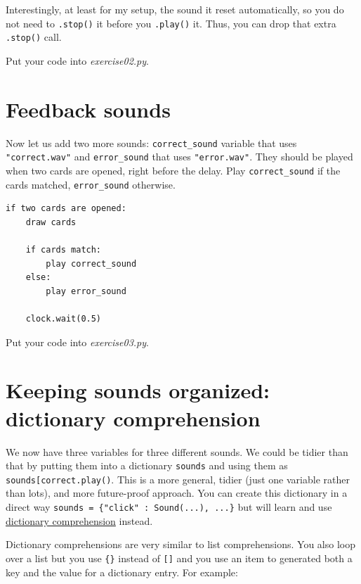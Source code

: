 \documentclass[
]{book}
\begin{document}
Interestingly, at least for my setup, the sound it reset automatically, so you do not need to \texttt{.stop()} it before you \texttt{.play()} it. Thus, you can drop that extra \texttt{.stop()} call.

Put your code into \emph{exercise02.py}.

\hypertarget{feedback-sounds}{%
\section{Feedback sounds}\label{feedback-sounds}}

Now let us add two more sounds: \texttt{correct\_sound} variable that uses \texttt{"correct.wav"} and \texttt{error\_sound} that uses \texttt{"error.wav"}. They should be played when two cards are opened, right before the delay. Play \texttt{correct\_sound} if the cards matched, \texttt{error\_sound} otherwise.

\begin{verbatim}
if two cards are opened:
    draw cards
    
    if cards match:
        play correct_sound
    else:
        play error_sound
        
    clock.wait(0.5)
\end{verbatim}

Put your code into \emph{exercise03.py}.

\hypertarget{keeping-sounds-organized-dictionary-comprehension}{%
\section{Keeping sounds organized: dictionary comprehension}\label{keeping-sounds-organized-dictionary-comprehension}}

We now have three variables for three different sounds. We could be tidier than that by putting them into a dictionary \texttt{sounds} and using them as \texttt{sounds{[}\textquotesingle{}correct\textquotesingle{}{]}.play()}. This is a more general, tidier (just one variable rather than lots), and more future-proof approach. You can create this dictionary in a direct way \texttt{sounds\ =\ \{"click"\ :\ Sound(...),\ ...\}} but will learn and use \href{https://www.python.org/dev/peps/pep-0274/}{dictionary comprehension} instead.

Dictionary comprehensions are very similar to list comprehensions. You also loop over a list but you use \texttt{\{\}} instead of \texttt{{[}{]}} and you use an item to generated both a key and the value for a dictionary entry. For example:
\end{document}
